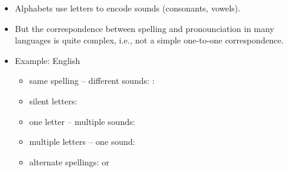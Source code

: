 \documentclass[a4paper,landscape,headrule,footrule,xetex]{foils}
\begin{document}
\begin{itemize}
\item Alphabets use letters to encode sounds (consonants, vowels).
\item But the correspondence between spelling and pronounciation in many languages is quite complex, i.e., not a simple one-to-one correspondence.
\item Example: English
\begin{itemize}
\item same spelling – different sounds: : 
\item silent letters: 
\item one letter – multiple sounds: 
\item multiple letters – one sound: 
\item alternate spellings:  or 
\end{itemize}
\end{itemize}












\end{document}
